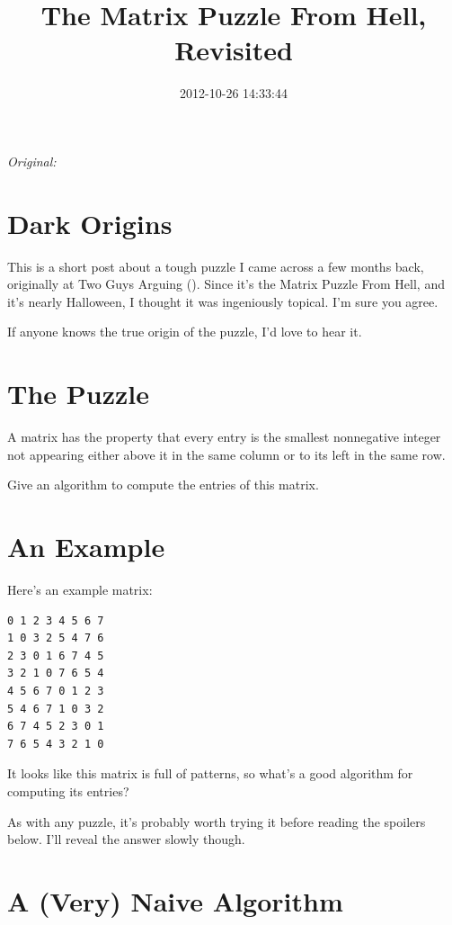 \documentclass[11pt]{article}
\begin{document}
\title{The Matrix Puzzle From Hell, Revisited}
\date{2012-10-26 14:33:44}
\maketitle

\noindent\textit{Original: }\texttt{}\par
\medskip
\section{Dark Origins}

This is a short post about a tough puzzle I came across a few months back, originally at Two Guys Arguing (\texttt{}). Since it's the Matrix Puzzle From Hell, and it's nearly Halloween, I thought it was ingeniously topical. I'm sure you agree.

If anyone knows the true origin of the puzzle, I'd love to hear it.
\section{The Puzzle}

A matrix has the property that every entry is the smallest nonnegative integer not appearing either above it in the same column or to its left in the same row.

Give an algorithm to compute the entries of this matrix.
\section{An Example}

Here's an example matrix:
\begin{lstlisting}
0 1 2 3 4 5 6 7
1 0 3 2 5 4 7 6
2 3 0 1 6 7 4 5
3 2 1 0 7 6 5 4
4 5 6 7 0 1 2 3
5 4 6 7 1 0 3 2
6 7 4 5 2 3 0 1
7 6 5 4 3 2 1 0
\end{lstlisting}

It looks like this matrix is full of patterns, so what's a good algorithm for computing its entries?

As with any puzzle, it's probably worth trying it before reading the spoilers below. I'll reveal the answer slowly though.
\section{A (Very) Naive Algorithm}
\end{document}
